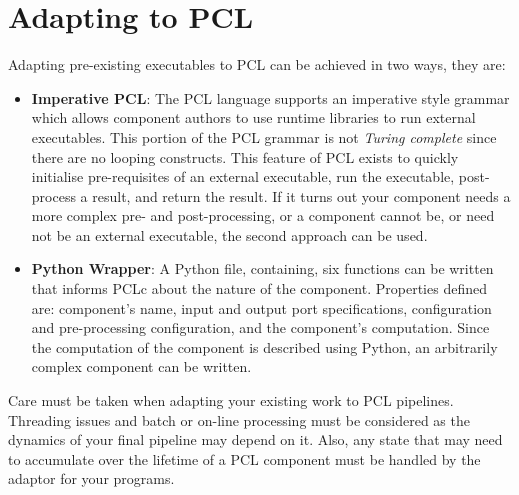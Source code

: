 \chapter{Adapting to PCL}
Adapting pre-existing executables to PCL can be achieved in two ways, they are:
\begin{itemize}
\item \textbf{Imperative PCL}: The PCL language supports an imperative style grammar which allows component authors to use runtime libraries to run external executables. This portion of the PCL grammar is not \emph{Turing complete} since there are no looping constructs. This feature of PCL exists to quickly initialise pre-requisites of an external executable, run the executable, post-process a result, and return the result. If it turns out your component needs a more complex pre- and post-processing, or a component cannot be, or need not be an external executable, the second approach can be used.
\item \textbf{Python Wrapper}: A Python file, containing, six functions can be written that informs PCLc about the nature of the component. Properties defined are: component's name, input and output port specifications, configuration and pre-processing configuration, and the component's computation. Since the computation of the component is described using Python, an arbitrarily complex component can be written.
\end{itemize}

Care must be taken when adapting your existing work to PCL pipelines. Threading issues and batch or on-line processing must be considered as the dynamics of your final pipeline may depend on it. Also, any state that may need to accumulate over the lifetime of a PCL component must be handled by the adaptor for your programs.

